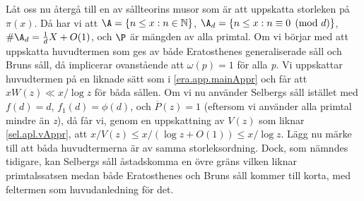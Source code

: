Låt oss nu återgå till en av sållteorins musor som är att uppskatta storleken på \(\pi(x)\).
Då har vi att \(\A = \{n \leq x: n \in \mathbb{N}\}\), \(\A_d = \{n \leq x: n\equiv 0 \pmod d\}\), \(\#\A_d = \frac{1}{d}X + O(1)\), och \(\P\) är mängden av alla primtal. 
Om vi börjar med att uppskatta huvudtermen som ges av både Eratosthenes generaliserade såll och Bruns såll, då implicerar ovanstående att \(\omega(p) = 1\) för alla \textit{p}.
Vi uppskattar huvudtermen på en liknade sätt som i \eqref{era.app.mainAppr} och får att \(xW(z) \ll x/\log z\) för båda sållen.
Om vi nu använder Selbergs såll istället med \(f(d) = d\), \(f_1(d) = \phi(d)\), och \(\overline{P}(z) = 1\) (eftersom vi använder alla primtal mindre än \textit{z}), då får vi, genom en uppskattning av \(V(z)\) som liknar \eqref{sel.apl.vAppr}, att \(x/V(z) \leq x/(\log z + O(1)) \leq x/\log z\).
Lägg nu märke till att båda huvudtermerna är av samma storleksordning.
Dock, som nämndes tidigare, kan Selbergs såll åstadskomma en övre gräns vilken liknar primtalssatsen medan både Eratosthenes och Bruns såll kommer till korta, med feltermen som huvudanledning för det.


